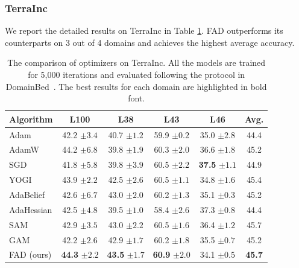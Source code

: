 \subsubsection{TerraInc}
We report the detailed results on TerraInc in Table \ref{tab:terra5k}. FAD outperforms its counterparts on 3 out of 4 domains and achieves the highest average accuracy.
\begin{table}[th]
\centering
\caption{The comparison of optimizers on TerraInc. All the models are trained for 5,000 iterations and evaluated following the protocol in DomainBed~\cite{gulrajani2020search}. The best results for each domain are highlighted in bold font.}
\begin{tabular}{lcccc|c}
\toprule
\textbf{Algorithm} & L100 & L38 & L43 & L46  & \textbf{Avg.} \\
\midrule

Adam  & 42.2 \footnotesize{$\pm 3.4$} & 40.7 \footnotesize{$\pm 1.2$} & 59.9 \footnotesize{$\pm 0.2$} & 35.0 \footnotesize{$\pm 2.8$} & 44.4  \\
AdamW  & 44.2 \footnotesize{$\pm 6.8$} & 39.8 \footnotesize{$\pm 1.9$} & 60.3 \footnotesize{$\pm 2.0$} & 36.6 \footnotesize{$\pm 1.8$} & 45.2 \\
SGD  & 41.8 \footnotesize{$\pm 5.8$} & 39.8 \footnotesize{$\pm 3.9$} & 60.5 \footnotesize{$\pm 2.2$} & \textbf{37.5} \footnotesize{$\pm 1.1$} & 44.9 \\
YOGI  & 43.9 \footnotesize{$\pm 2.2$} & 42.5 \footnotesize{$\pm 2.6$} & 60.5 \footnotesize{$\pm 1.1$} & 34.8 \footnotesize{$\pm 1.6$} & 45.4 \\
AdaBelief  & 42.6 \footnotesize{$\pm 6.7$} & 43.0 \footnotesize{$\pm 2.0$} & 60.2 \footnotesize{$\pm 1.3$} & 35.1 \footnotesize{$\pm 0.3$} & 45.2 \\
AdaHessian  & 42.5 \footnotesize{$\pm 4.8$} & 39.5 \footnotesize{$\pm 1.0$} & 58.4 \footnotesize{$\pm 2.6$} & 37.3 \footnotesize{$\pm 0.8$} & 44.4 \\
SAM  & 42.9 \footnotesize{$\pm 3.5$} &  43.0 \footnotesize{$\pm 2.2$} & 60.5 \footnotesize{$\pm 1.6$} & 36.4 \footnotesize{$\pm 1.2$} & 45.7\\
GAM  & 42.2 \footnotesize{$\pm 2.6$} & 42.9 \footnotesize{$\pm 1.7$}  & 60.2 \footnotesize{$\pm 1.8$} & 35.5 \footnotesize{$\pm 0.7$} & 45.2\\
\midrule
FAD (ours)  & \textbf{44.3} \footnotesize{$\pm 2.2$} & \textbf{43.5} \footnotesize{$\pm 1.7$}  & \textbf{60.9} \footnotesize{$\pm 2.0$} & 34.1 \footnotesize{$\pm 0.5$} &  \textbf{45.7}\\

\bottomrule
\end{tabular}
\label{tab:terra5k}
\end{table}

